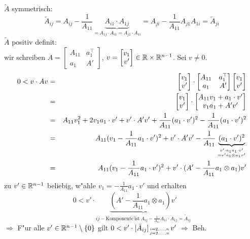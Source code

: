 \documentclass{scrartcl}
\begin{document}
\begin{Bew}
\begin{iaufz}
$\tilde A$ symmetrisch: \\
$$ \tilde A_{ij} = A_{ij} - \frac{1}{A_{11}} \underbrace{ A_{i1} \cdot A_{1j}}_{= A_{1j} \cdot A_{i1} = A_{j1} \cdot A_{1i}} = A_{ji} - \frac{1}{A_{11}} A_{j1} A_{1i}= \tilde A_{ji}$$
$\tilde A$ positiv definit: \\
wir schreiben $A = \left[ \begin{matrix} A_{11} & a_1^\top \\ a_1 & A' \end{matrix} \right]$, $v = \left[ \begin{matrix} v_1 \\ v' \end{matrix} \right] \in \mathbb{R} \times \mathbb{R}^{n-1}$. Sei $v \neq 0$.
\begin{eqnarray*}
0 < v \cdot Av & = & \left[ \begin{matrix} v_1 \\ v' \end{matrix} \right] \cdot \left[ \begin{matrix} A_{11} & a_1^\top \\ a_1 & A' \end{matrix} \right] \left[ \begin{matrix} v_1 \\ v' \end{matrix} \right] \\
& = & \left[ \begin{matrix}v_1 \\ v' \end{matrix} \right] \cdot \left[ \begin{matrix} A_{11} v_1 + a_1 \cdot v' \\ v_1 a_1 + A' v' \end{matrix} \right] \\ 
& = & A_{11} v_1^2 + 2v_1 a_1 \cdot v' + v' \cdot A' v' + \frac{1}{A_{11}}(a_1 \cdot v')^2 - \frac{1}{A_{11}}(a_1 \cdot v')^2 \\
& = & A_{11} (v_1 - \frac{1}{A_{11}} a_1 \cdot v' ) ^2 + v' \cdot A' v' - \frac{1}{A_{11}} \underbrace{(a_1 \cdot v')^2}_{\genfrac{}{}{0pt}{}{v' \cdot a_1 a_1 \cdot v'}{= v' \dot a_1 \otimes a_1 v'}} \\
& = & A_{11} (v_1 - \frac{1}{A_{11}}a_1 \cdot v')^2 + v' \cdot ( A' - \frac{1}{A_{11}}a_1 \otimes a_1) v'
\end{eqnarray*}
zu $v' \in \mathbb{R}^{n-1}$ beliebig, w"ahle $v_1 = - \frac{1}{A_{11}} a_1 \cdot v'$ und erhalten
$$0 < v' \cdot \underbrace{(A' - \frac{1}{A_{11}} a_1 \otimes a_1) v'}_{ij-\mathrm{Komponente \ ist \ } A_{ij} - \frac{1}{A_{11}} A_{1i} \cdot A_{1j} = \tilde A_{ij}}$$
$\Rightarrow$ F"ur alle $v' \in \mathbb{R}^{n-1} \setminus \{ 0 \}$ gilt 
$0 < v' \cdot [ \tilde A_{ij} ]_{\genfrac{}{}{0pt}{}{i = 2, \ldots, n}{j = 2, \ldots, n}} v'$ $\Rightarrow$ Beh.
\end{iaufz}
\end{Bew}
\end{document}
